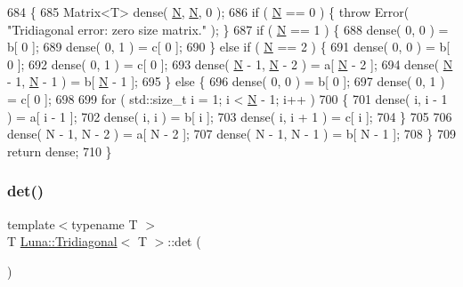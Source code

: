 \begin{DoxyCode}
684   \{
685     Matrix<T> dense( \hyperlink{namespaceHeat__plot_a7d050092798e28458a263710837bda77}{N}, \hyperlink{namespaceHeat__plot_a7d050092798e28458a263710837bda77}{N}, 0 );
686     \textcolor{keywordflow}{if} ( \hyperlink{namespaceHeat__plot_a7d050092798e28458a263710837bda77}{N} == 0 ) \{ \textcolor{keywordflow}{throw} Error( \textcolor{stringliteral}{"Tridiagonal error: zero size matrix."} ); \}
687     \textcolor{keywordflow}{if} ( \hyperlink{namespaceHeat__plot_a7d050092798e28458a263710837bda77}{N} == 1 ) \{
688       dense( 0, 0 ) = b[ 0 ];
689       dense( 0, 1 ) = c[ 0 ];
690     \} \textcolor{keywordflow}{else} \textcolor{keywordflow}{if} ( \hyperlink{namespaceHeat__plot_a7d050092798e28458a263710837bda77}{N} == 2 ) \{
691       dense( 0, 0 ) = b[ 0 ];
692       dense( 0, 1 ) = c[ 0 ];
693       dense( \hyperlink{namespaceHeat__plot_a7d050092798e28458a263710837bda77}{N} - 1, \hyperlink{namespaceHeat__plot_a7d050092798e28458a263710837bda77}{N} - 2 ) = a[ \hyperlink{namespaceHeat__plot_a7d050092798e28458a263710837bda77}{N} - 2 ];
694       dense( \hyperlink{namespaceHeat__plot_a7d050092798e28458a263710837bda77}{N} - 1, \hyperlink{namespaceHeat__plot_a7d050092798e28458a263710837bda77}{N} - 1 ) = b[ \hyperlink{namespaceHeat__plot_a7d050092798e28458a263710837bda77}{N} - 1 ];
695     \} \textcolor{keywordflow}{else} \{
696       dense( 0, 0 ) = b[ 0 ];
697       dense( 0, 1 ) = c[ 0 ];
698 
699       \textcolor{keywordflow}{for} ( std::size\_t i = 1; i < \hyperlink{namespaceHeat__plot_a7d050092798e28458a263710837bda77}{N} - 1; i++ )
700       \{
701         dense( i, i - 1 ) = a[ i - 1 ];
702         dense( i, i ) = b[ i ];
703         dense( i, i + 1 ) = c[ i ];
704       \}
705 
706       dense( N - 1, N - 2 ) = a[ N - 2 ];
707       dense( N - 1, N - 1 ) = b[ N - 1 ];
708     \}
709     \textcolor{keywordflow}{return} dense;
710   \}
\end{DoxyCode}
\mbox{\label{classLuna_1_1Tridiagonal_ab1be45e74b066c5e2ac73d4d1cccb3da}} 
\subsubsection{\texorpdfstring{det()}{det()}}
{\footnotesize\ttfamily template$<$typename T $>$ \\
T \hyperlink{classLuna_1_1Tridiagonal}{Luna\+::\+Tridiagonal}$<$ T $>$\+::det (\begin{DoxyParamCaption}{ }\end{DoxyParamCaption})\hspace{0.3cm}{\ttfamily [inline]}}



